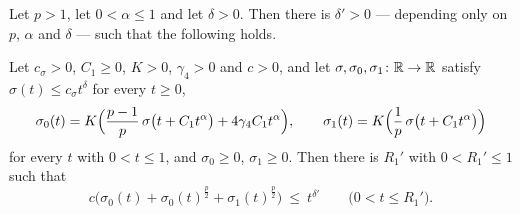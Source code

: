 \begin{lemma}
Let $p>1$, let $0<\alpha\le1$ and let $\delta>0$.  Then there is $\delta'>0$ ---
depending only on $p$, $\alpha$ and $\delta$ --- such that the following holds.

Let $c_\sigma>0$, $C_1\ge0$, $K>0$, $\gamma_4>0$ and $c>0$, and let
$\sigma,\sigma_0,\sigma_1\colon\mathbb{R}\to\mathbb{R}$ satisfy
$\sigma(t)\le c_\sigma t^{\delta}$ for every $t\ge0$,
\[
\sigma_0(t)=K\Bigl(\frac{p-1}p\,\sigma\bigl(t+C_1t^{\alpha}\bigr)
+4\gamma_4C_1t^{\alpha}\Bigr),
\qquad
\sigma_1(t)=K\Bigl(\frac1p\,\sigma\bigl(t+C_1t^{\alpha}\bigr)\Bigr)
\]
for every $t$ with $0<t\le1$, and $\sigma_0\ge0$, $\sigma_1\ge0$.  Then there is
$R_1'$ with $0<R_1'\le1$ such that
\[
c\bigl(\sigma_0(t)+\sigma_0(t)^{\frac p2}+\sigma_1(t)^{\frac p2}\bigr)
\ \le\ t^{\delta'}
\qquad\bigl(0<t\le R_1'\bigr).
\]
\end{lemma}
